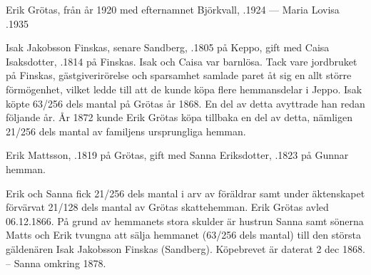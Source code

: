 Erik Grötas, från år 1920 med efternamnet Björkvall, .1924  ---  Maria Lovisa .1935


Isak Jakobsson Finskas, senare Sandberg, .1805 på Keppo, gift med Caisa Isaksdotter, .1814 på Finskas. Isak och Caisa var barnlösa. Tack vare jordbruket på Finskas, gästgiverirörelse och sparsamhet samlade paret åt sig en allt större förmögenhet, vilket ledde till att de kunde köpa flere hemmansdelar i Jeppo. Isak köpte 63/256 dels mantal på Grötas år 1868. En del av detta avyttrade han redan följande år. År 1872 kunde Erik Grötas köpa tillbaka en del av detta, nämligen 21/256 dels mantal av familjens ursprungliga hemman.


Erik Mattsson, .1819 på Grötas, gift med Sanna Eriksdotter, .1823 på Gunnar hemman.
\begin{jhchildren}
  \item {}
  \item {}
  \item {}
  \item {}
  \item {}
  \item {}
  \item {}
  \item {}
  \item {}
  \item {}
  \item {}
\end{jhchildren}

Erik och Sanna fick 21/256 dels mantal i arv av föräldrar samt under äktenskapet förvärvat 21/128 dels mantal av Grötas skattehemman.	Erik Grötas avled 06.12.1866. På grund av  hemmanets stora skulder är hustrun Sanna samt sönerna Matts och Erik tvungna att sälja hemmanet (63/256 dels mantal) till den största gäldenären Isak Jakobsson Finskas (Sandberg). Köpebrevet är daterat 2 dec 1868. -- Sanna \textdied omkring 1878.


